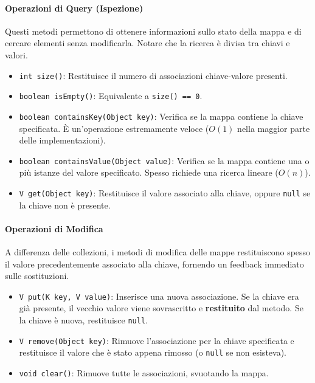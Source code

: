 \paragraph{Operazioni di Query (Ispezione)}

Questi metodi permettono di ottenere informazioni sullo stato della mappa e di cercare elementi senza modificarla. Notare che la ricerca è divisa tra chiavi e valori.

\begin{itemize}
    \item \texttt{int size()}: Restituisce il numero di associazioni chiave-valore presenti.
    \item \texttt{boolean isEmpty()}: Equivalente a \texttt{size() == 0}.
    \item \texttt{boolean containsKey(Object key)}: Verifica se la mappa contiene la chiave specificata. È un'operazione estremamente veloce ($O(1)$ nella maggior parte delle implementazioni).
    \item \texttt{boolean containsValue(Object value)}: Verifica se la mappa contiene una o più istanze del valore specificato. Spesso richiede una ricerca lineare ($O(n)$).
    \item \texttt{V get(Object key)}: Restituisce il valore associato alla chiave, oppure \texttt{null} se la chiave non è presente.
\end{itemize}

\paragraph{Operazioni di Modifica}

A differenza delle collezioni, i metodi di modifica delle mappe restituiscono spesso il valore precedentemente associato alla chiave, fornendo un feedback immediato sulle sostituzioni.

\begin{itemize}
    \item \texttt{V put(K key, V value)}: Inserisce una nuova associazione. Se la chiave era già presente, il vecchio valore viene sovrascritto e \textbf{restituito} dal metodo. Se la chiave è nuova, restituisce \texttt{null}.
    \item \texttt{V remove(Object key)}: Rimuove l'associazione per la chiave specificata e restituisce il valore che è stato appena rimosso (o \texttt{null} se non esisteva).
    \item \texttt{void clear()}: Rimuove tutte le associazioni, svuotando la mappa.
\end{itemize}

